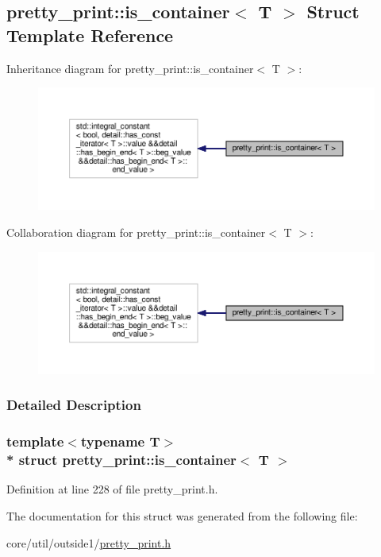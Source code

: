 \hypertarget{structpretty__print_1_1is__container}{}\subsection{pretty\+\_\+print\+:\+:is\+\_\+container$<$ T $>$ Struct Template Reference}
\label{structpretty__print_1_1is__container}


Inheritance diagram for pretty\+\_\+print\+:\+:is\+\_\+container$<$ T $>$\+:
\nopagebreak
\begin{figure}[H]
\begin{center}
\leavevmode
\includegraphics[width=350pt]{structpretty__print_1_1is__container__inherit__graph}
\end{center}
\end{figure}


Collaboration diagram for pretty\+\_\+print\+:\+:is\+\_\+container$<$ T $>$\+:
\nopagebreak
\begin{figure}[H]
\begin{center}
\leavevmode
\includegraphics[width=350pt]{structpretty__print_1_1is__container__coll__graph}
\end{center}
\end{figure}


\subsubsection{Detailed Description}
\subsubsection*{template$<$typename T$>$\\*
struct pretty\+\_\+print\+::is\+\_\+container$<$ T $>$}



Definition at line 228 of file pretty\+\_\+print.\+h.



The documentation for this struct was generated from the following file\+:\begin{DoxyCompactItemize}
\item 
core/util/outside1/\hyperlink{pretty__print_8h}{pretty\+\_\+print.\+h}\end{DoxyCompactItemize}
